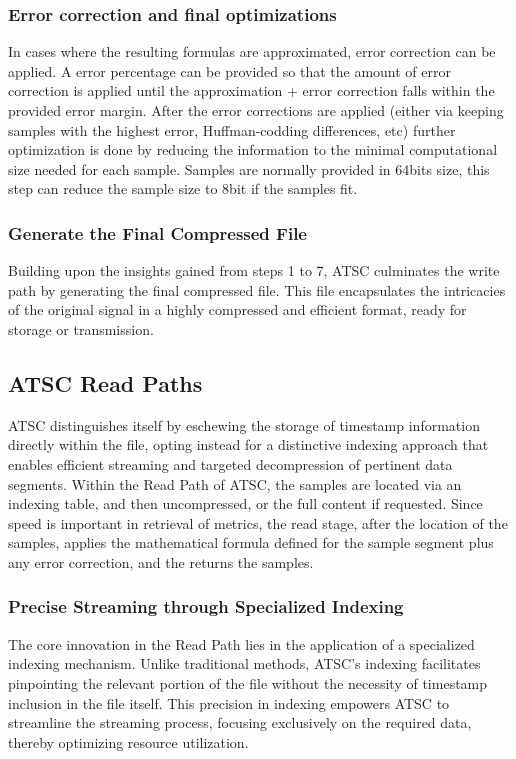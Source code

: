\documentclass[conference]{IEEEtran}
\begin{document}
\vspace{10pt}
\subsubsection{Error correction and final optimizations}
In cases where the resulting formulas are approximated, error correction can be applied. A error percentage can be provided so that the amount of error correction is applied until the approximation + error correction falls within the provided error margin. After the error corrections are applied (either via keeping samples with the highest error, Huffman-codding differences, etc) further optimization is done by reducing the information to the minimal computational size needed for each sample. Samples are normally provided in 64bits size, this step can reduce the sample size to 8bit if the samples fit.

\vspace{10pt}
\subsubsection{Generate the Final Compressed File}
Building upon the insights gained from steps 1 to 7, ATSC culminates the write path by generating the final compressed file. This file encapsulates the intricacies of the original signal in a highly compressed and efficient format, ready for storage or transmission.


\subsection{ATSC Read Paths}

ATSC distinguishes itself by eschewing the storage of timestamp information directly within the file, opting instead for a distinctive indexing approach that enables efficient streaming and targeted decompression of pertinent data segments.
Within the Read Path of ATSC, the samples are located via an indexing table, and then uncompressed, or the full content if requested. 
Since speed is important in retrieval of metrics, the read stage, after the location of the samples, applies the mathematical formula defined for the sample segment plus any error correction, and the returns the samples. 

\vspace{10pt}
\subsubsection{Precise Streaming through Specialized Indexing}\label{SCMA}
The core innovation in the Read Path lies in the application of a specialized indexing mechanism. Unlike traditional methods, ATSC's indexing facilitates pinpointing the relevant portion of the file without the necessity of timestamp inclusion in the file itself. This precision in indexing empowers ATSC to streamline the streaming process, focusing exclusively on the required data, thereby optimizing resource utilization. 
\end{document}
